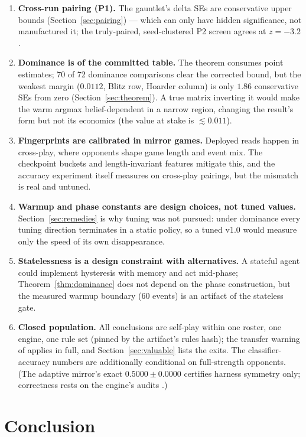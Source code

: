 \documentclass[11pt]{article}
\begin{document}
\begin{enumerate}
\item \textbf{Cross-run pairing (P1).} The gauntlet's delta SEs are conservative upper
  bounds (Section~\ref{sec:pairing}) --- which can only have hidden significance, not
  manufactured it; the truly-paired, seed-clustered P2 screen agrees at $z = -3.2$.
\item \textbf{Dominance is of the committed table.} The theorem consumes point estimates;
  70 of 72 dominance comparisons clear the corrected bound, but the weakest margin
  ($0.0112$, Blitz row, Hoarder column) is only $1.86$ conservative SEs from zero
  (Section~\ref{sec:theorem}). A true matrix inverting it would make the warm argmax
  belief-dependent in a narrow region, changing the result's form but not its economics
  (the value at stake is ${\lesssim}0.011$).
\item \textbf{Fingerprints are calibrated in mirror games.} Deployed reads happen in
  cross-play, where opponents shape game length and event mix. The checkpoint buckets and
  length-invariant features mitigate this, and the accuracy experiment itself measures on
  cross-play pairings, but the mismatch is real and untuned.
\item \textbf{Warmup and phase constants are design choices, not tuned values.}
  Section~\ref{sec:remedies} is why tuning was not pursued: under dominance every tuning
  direction terminates in a static policy, so a tuned v1.0 would measure only the speed
  of its own disappearance.
\item \textbf{Statelessness is a design constraint with alternatives.} A stateful agent
  could implement hysteresis with memory and act mid-phase; Theorem~\ref{thm:dominance}
  does not depend on the phase construction, but the measured warmup boundary (60 events)
  is an artifact of the stateless gate.
\item \textbf{Closed population.} All conclusions are self-play within one roster, one
  engine, one rule set (pinned by the artifact's rules hash); the transfer warning of
  \cite{hu2020} applies in full, and Section~\ref{sec:valuable} lists the exits. The
  classifier-accuracy numbers are additionally conditional on full-strength opponents.
  (The adaptive mirror's exact $0.5000 \pm 0.0000$ certifies harness symmetry only;
  correctness rests on the engine's audits \cite{v05paper,repo}.)
\end{enumerate}

\section{Conclusion}
\label{sec:conclusion}
\end{document}
